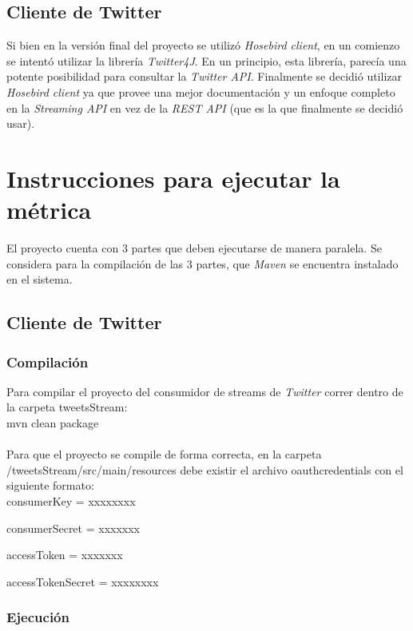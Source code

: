 \documentclass[a4paper,10pt]{article}
\begin{document}
\subsection{Cliente de Twitter}

Si bien en la versión final del proyecto se utilizó \textit{Hosebird client}, en un comienzo se intentó utilizar la librería \textit{Twitter4J}. En un principio, esta librería,
parecía una potente posibilidad para consultar la \textit{Twitter API}. Finalmente se decidió utilizar \textit{Hosebird client} ya que provee una mejor documentación y un enfoque
completo en la \textit{Streaming API} en vez de la \textit{REST API} (que es la que finalmente se decidió usar).

\section{Instrucciones para ejecutar la métrica}

El proyecto cuenta con 3 partes que deben ejecutarse de manera paralela.
Se considera para la compilación de las 3 partes, que \textit{Maven} se encuentra instalado en el sistema.

\subsection{Cliente de Twitter}

\subsubsection{Compilación}

Para compilar el proyecto del consumidor de streams de \textit{Twitter} correr dentro de la carpeta tweetsStream:
\\

    mvn clean package
\\
\\
Para que el proyecto se compile de forma correcta, en la carpeta /tweetsStream/src/main/resources debe existir el archivo oauthcredentials con el siguiente formato:
\\

consumerKey = xxxxxxxx

consumerSecret = xxxxxxx

accessToken = xxxxxxx

accessTokenSecret = xxxxxxxx

\subsubsection{Ejecución}
\end{document}
